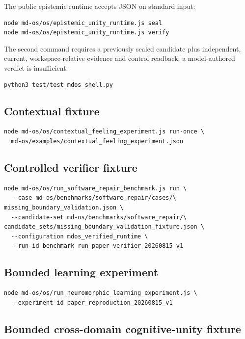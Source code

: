 \documentclass[10pt,twocolumn]{article}
\theoremstyle{definition}
\theoremstyle{plain}
\theoremstyle{remark}
\begin{document}
The public epistemic runtime accepts JSON on standard input:

\begin{lstlisting}
node md-os/os/epistemic_unity_runtime.js seal
node md-os/os/epistemic_unity_runtime.js verify
\end{lstlisting}

The second command requires a previously sealed candidate plus independent, current, workspace-relative evidence and control readback; a model-authored verdict is insufficient.

\begin{lstlisting}
python3 test/test_mdos_shell.py
\end{lstlisting}

\subsection{Contextual fixture}

\begin{lstlisting}
node md-os/os/contextual_feeling_experiment.js run-once \
  md-os/examples/contextual_feeling_experiment.json
\end{lstlisting}

\subsection{Controlled verifier fixture}

\begin{lstlisting}
node md-os/os/run_software_repair_benchmark.js run \
  --case md-os/benchmarks/software_repair/cases/\
missing_boundary_validation.json \
  --candidate-set md-os/benchmarks/software_repair/\
candidate_sets/missing_boundary_validation_fixture.json \
  --configuration mdos_verified_runtime \
  --run-id benchmark_run_paper_verifier_20260815_v1
\end{lstlisting}

\subsection{Bounded learning experiment}

\begin{lstlisting}
node md-os/os/run_neuromorphic_learning_experiment.js \
  --experiment-id paper_reproduction_20260815_v1
\end{lstlisting}

\subsection{Bounded cross-domain cognitive-unity fixture}
\end{document}
